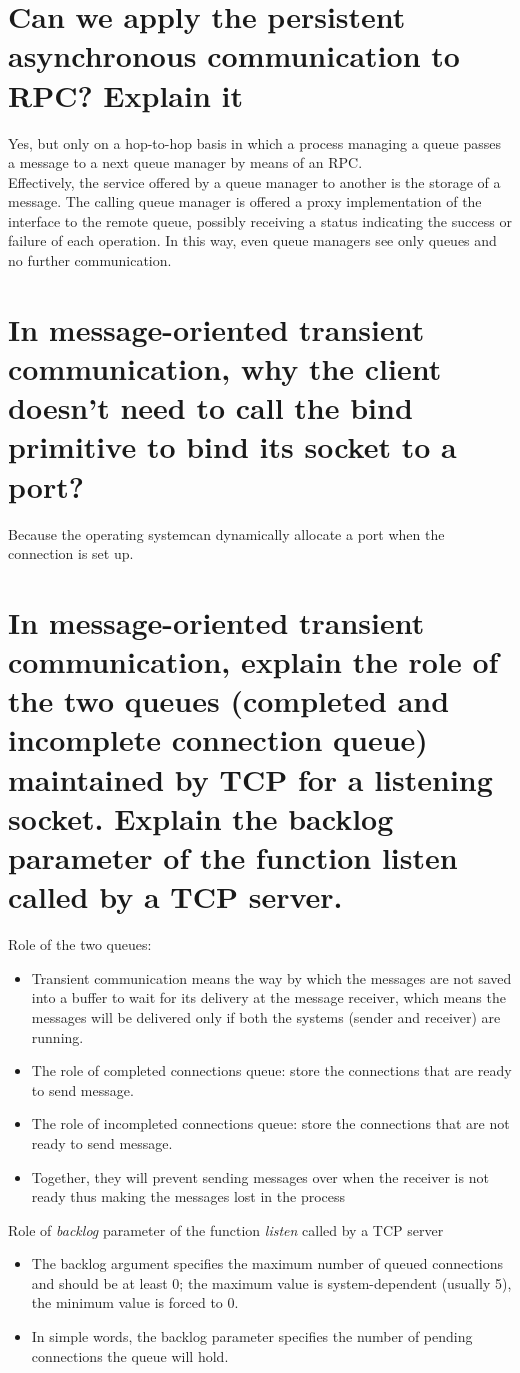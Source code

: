 \documentclass[11pt,a4paper]{article}
\begin{document}
	\section{Can we apply the persistent asynchronous communication to RPC? Explain it}
	Yes, but only on a hop-to-hop basis in which a process managing a queue
passes a message to a next queue manager by means of an RPC.\\
	Effectively, the service offered by a queue manager to another is the storage of a message. The calling queue manager is offered a proxy implementation of the interface to the remote queue, possibly receiving a status indicating the success or failure of each operation. In this way, even queue managers see only queues and no further communication.
	
	\section{In message-oriented transient communication, why the client doesn’t need to call the bind primitive to bind its socket to a port?}
	Because the operating systemcan dynamically allocate a port when the connection is set up.
	
	\section{In message-oriented transient communication, explain the role of the two queues (completed and incomplete connection queue) maintained by TCP for a listening socket. Explain the backlog parameter of the function listen called by a TCP server.}
	Role of the two queues:
	\begin{itemize}
		\item  Transient communication means the way by which the messages are not saved into a buffer to wait for its delivery at the message receiver, which means the messages will be delivered only if both the systems (sender and receiver) are running.
		\item The role of completed connections queue: store the connections that are ready to send message.
		\item  The role of incompleted connections queue: store the connections that are not ready to send message.
		\item Together, they will prevent sending messages over when the receiver is not ready thus making the messages lost in the process 
	\end{itemize}
	Role of \emph{backlog} parameter of the function \emph{listen} called by a TCP server
	\begin{itemize}
		\item The backlog argument specifies the maximum number of queued connections and should be at least 0; the maximum value is system-dependent (usually 5), the minimum value is forced to 0.
		\item In simple words, the backlog parameter specifies the number of pending connections the queue will hold.
	\end{itemize}
	
\end{document}
